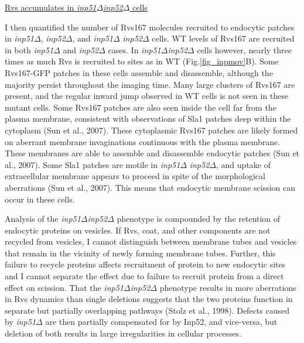 \vspace{5mm}
\underline{Rvs accumulates in \textit{inp51$\Delta$}\textit{inp52$\Delta$} cells }

I then quantified the number of Rvs167 molecules recruited to endocytic patches in \textit{inp51$\Delta$}, \textit{inp52$\Delta$}, and \textit{inp51$\Delta$} \textit{inp52$\Delta$} cells. WT levels of Rvs167 are recruited in both \textit{inp51$\Delta$} and \textit{inp52$\Delta$} cases. In \textit{inp51$\Delta$}\textit{inp52$\Delta$} cells however, nearly three times as much Rvs is recruited to sites as in WT (Fig.\ref{fig_inpmov}B). Some Rvs167-GFP patches in these cells assemble and disassemble, although the majority persist throughout the imaging time. Many large clusters of Rvs167 are present, and the regular inward jump observed in WT cells is not seen in these mutant cells. Some Rvs167 patches are also seen inside the cell far from the plasma membrane, consistent with observations of Sla1 patches deep within the cytoplasm (Sun et al., 2007). These cytoplasmic Rvs167 patches are likely formed on  aberrant membrane invaginations continuous with the plasma membrane. These membranes are able to assemble and disassemble endocytic patches (Sun et al., 2007). Some Sla1 patches are motile in \textit{inp51$\Delta$} \textit{inp52$\Delta$}, and uptake of extracellular membrane appears to proceed in spite of the morphological aberrations (Sun et al., 2007). This means that endocytic membrane scission can occur in these cells. 



\vspace{5mm}
Analysis of the \textit{inp51$\Delta$}\textit{inp52$\Delta$} phenotype is compounded by the retention of endocytic proteins on vesicles. If Rvs, coat, and other components are not recycled from vesicles, I cannot distinguish between membrane tubes and vesicles that remain in the vicinity of newly forming membrane tubes. Further, this failure to recycle proteins affects recruitment of protein to new endocytic sites and I cannot separate the effect due to failure to recruit protein from a direct effect on scission. That  the \textit{inp51$\Delta$}\textit{inp52$\Delta$} phenotype results in more aberrations in Rvs dynamics than single deletions suggests that the two proteins function in separate but partially overlapping pathways (Stolz et al., 1998). Defects caused by \textit{inp51$\Delta$}
are then partially compensated for by Inp52, and vice-versa, but deletion of both results in large irregularities in cellular processes.







